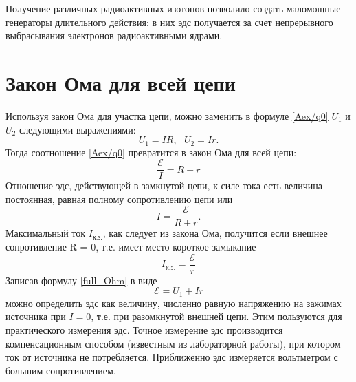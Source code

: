 \documentclass[a4paper,10pt]{book}
\begin{document}
Получение различных радиоактивных изотопов позволило создать маломощные генераторы длительного действия; в них эдс получается за счет непрерывного
выбрасывания электронов радиоактивными ядрами.
\section{Закон Ома для всей цепи}
Используя закон Ома для участка цепи, можно заменить в формуле \ref{Aex/q0} $U_1$ и $U_2$ следующими выражениями:
\begin{equation}
 U_1 = IR,\text{ }U_2 = Ir.\nonumber
\end{equation}
Тогда соотношение \ref{Aex/q0} превратится в закон Ома для всей цепи: 
\begin{equation}\label{full_Ohm}
 \frac{\mathcal{E}}{I} = R + r
\end{equation}
Отношение эдс, действующей в замкнутой цепи, к силе тока есть величина постоянная, равная полному сопротивлению цепи или 
\begin{equation}\label{full_I}
 I = \frac{\mathcal{E}}{R + r}.
\end{equation}
Максимальный ток $I_\text{к.з.}$, как следует из закона Ома, получится если внешнее сопротивление R = 0, т.е. имеет место короткое замыкание
\begin{equation}\label{I_shcut}
 I_\text{к.з.} = \frac{\mathcal{E}}{r}
\end{equation}
Записав формулу \ref{full_Ohm} в виде
\begin{equation}
 \mathcal{E} = U_1 + Ir\nonumber
\end{equation}
можно определить эдс как величину, численно равную напряжению на зажимах источника при $I = 0$, т.е. при разомкнутой внешней цепи.
Этим пользуются для практического измерения эдс. Точное измерение эдс производится компенсационным способом (известным из лабораторной 
работы), при котором ток от источника не потребляется. Приближенно эдс измеряется вольтметром с большим сопротивлением.
\end{document}
